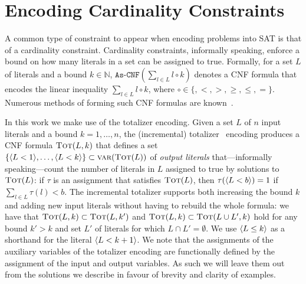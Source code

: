 \section{Encoding Cardinality Constraints\label{sec:card-const}}

A common type of constraint to appear when encoding problems into SAT is that of a cardinality constraint.
Cardinality constraints, informally speaking, enforce a bound on how many literals in a set can be assigned to true.
Formally, for a set $L$ of literals and a bound $k \in \mathbb{N}$, $\texttt{As-CNF}\left(\sum_{l \in L} l \circ k\right)$ denotes a CNF formula that encodes the linear inequality $\sum_{l \in L} l \circ k$, where $\circ \in \{ ,< ,> ,\geq, \leq, =\}$.
Numerous methods of forming such CNF formulas are known~\autocite{DBLP:conf/cp/BailleuxB03}.

In this work we make use of the totalizer encoding.
Given a set $L$ of $n$ input literals and a bound $k=1, \ldots, n$, the (incremental) totalizer~\autocite{DBLP:conf/cp/BailleuxB03,DBLP:conf/cp/MartinsJML14} encoding produces a CNF formula $\textsc{Tot}(L, k)$ that defines a set $\{\langle L < 1 \rangle, \ldots, \langle L < k \rangle\} \subset \textsc{var}(\textsc{Tot}(L))$ of \emph{output literals} that---informally speaking---count the number of literals in $L$ assigned to true by solutions to $\textsc{Tot}(L)$:
if $\tau$ is an assignment that satisfies $\textsc{Tot}(L)$, then $\tau(\langle L < b \rangle) = 1$ if $\sum_{l \in L} \tau(l) < b$.
The incremental totalizer supports both increasing the bound $k$ and adding new input literals without having to rebuild the whole formula:
we have that $\textsc{Tot}(L, k) \subset \textsc{Tot}(L, k')$ and $\textsc{Tot}(L, k) \subset  \textsc{Tot}(L \cup L', k)$ hold for any bound $k' > k$ and set $L'$ of literals for which $L \cap L' =  \emptyset$. 
We use $\langle L \leq k \rangle$ as a shorthand for the literal $\langle L < k+1 \rangle$.
We note that the assignments of the auxiliary variables of the totalizer encoding are functionally defined by the assignment of the input and output variables.
As such we will leave them out from the solutions we describe in favour of brevity and clarity of examples. 